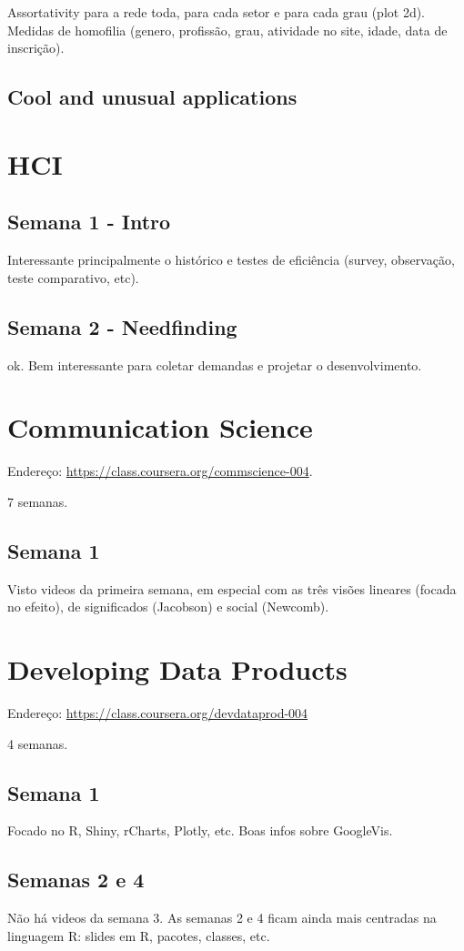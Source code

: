 \documentclass[12pt]{report}
\begin{document}
Assortativity para a rede toda, para cada setor e para cada grau (plot 2d). Medidas de homofilia (genero, profissão, grau, atividade no site, idade, data de inscrição).


\subsection{Cool and unusual applications}

\section{HCI}
\subsection{Semana 1 - Intro}
Interessante principalmente o histórico e testes de eficiência (survey, observação, teste comparativo, etc).
\subsection{Semana 2 - Needfinding}
ok. Bem interessante para coletar demandas e projetar o desenvolvimento.
\section{Communication Science}
Endereço: \url{https://class.coursera.org/commscience-004}.

7 semanas.
\subsection{Semana 1}
Visto videos da primeira semana, em especial com as três visões lineares (focada no efeito), de significados (Jacobson) e social (Newcomb).
\section{Developing Data Products}
Endereço: \url{https://class.coursera.org/devdataprod-004}

4 semanas.
\subsection{Semana 1}
Focado no R, Shiny, rCharts, Plotly, etc. Boas infos sobre GoogleVis.
\subsection{Semanas 2 e 4}
Não há videos da semana 3. As semanas 2 e 4 ficam ainda mais centradas na linguagem R: slides em R, pacotes, classes, etc.
\end{document}
